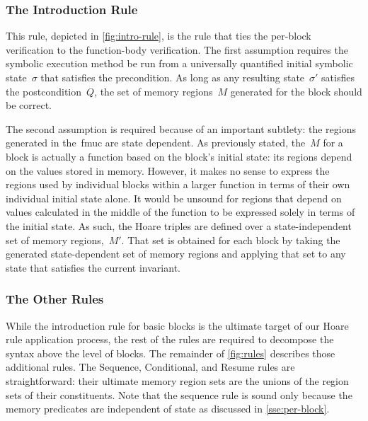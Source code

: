 \subsubsection{The Introduction Rule}
This rule, depicted in \cref{fig:intro-rule},
is the rule that ties the per-block verification to the function-body verification.
The first assumption requires the symbolic execution method be run
from a universally quantified initial symbolic state~$\sigma$ that satisfies the precondition.
As long as any resulting state~$\sigma'$ satisfies the postcondition~$Q$,
the set of memory regions~$M$ generated for the block should be correct.

The second assumption is required because of an important subtlety:
the regions generated in the~\ac{fmuc} are state dependent.
As previously stated,
the~$M$ for a block is actually a function based on the block's initial state:
its regions depend on the values stored in memory.
However, it makes no sense to express the regions used by individual blocks
within a larger function in terms of their own individual initial state alone.
It would be unsound for regions that depend on values calculated
in the middle of the function to be expressed solely in terms of the initial state.
As such,
the Hoare triples are defined over a state-independent set of memory regions,~$M'$.
That set is obtained for each block
by taking the generated state-dependent set of memory regions
and applying that set to any state that satisfies the current invariant.

\subsubsection{The Other Rules}
While the introduction rule for basic blocks
is the ultimate target of our Hoare rule application process,
the rest of the rules are required to decompose the syntax above the level of blocks.
The remainder of \cref{fig:rules} describes those additional rules.
The Sequence, Conditional, and Resume rules are straightforward:
their ultimate memory region sets are the unions of the region sets of their constituents.
Note that the sequence rule is sound only because the memory predicates
are independent of state as discussed in \cref{sse:per-block}.

